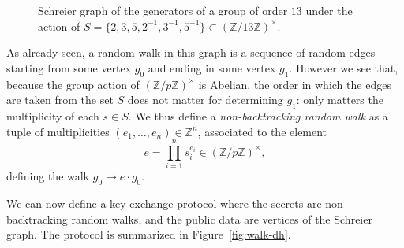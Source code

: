 \documentclass[10pt]{article}
\theoremstyle{plain}
\theoremstyle{definition}
\begin{document}
\begin{figure}
  \centering
  \caption{Schreier graph of the generators of a group of order $13$
    under the action of
    $S=\{2,3,5,2^{-1},3^{-1},5^{-1}\}⊂(ℤ/13ℤ)^{×}$.}
  \label{fig:schreier}
\end{figure}

As already seen, a random walk in this graph is a sequence of random
edges starting from some vertex $g_0$ and ending in some vertex
$g_1$. %
However we see that, because the group action of $(ℤ/pℤ)^×$ is
Abelian, the order in which the edges are taken from the set $S$ does
not matter for determining $g_1$: only matters the multiplicity of
each $s∈S$. %
We thus define a \emph{non-backtracking random walk} as a tuple of
multiplicities $(e_1,\dots,e_n)∈ℤ^n$, associated to the element
\[e = \prod_{i=1}^n s_i^{e_i} ∈ (ℤ/pℤ)^×,\]
defining the walk $g_0→e·g_0$. %

We can now define a key exchange protocol where the secrets are
non-backtracking random walks, and the public data are vertices of the
Schreier graph. %
The protocol is summarized in Figure~\ref{fig:walk-dh}.
\end{document}
